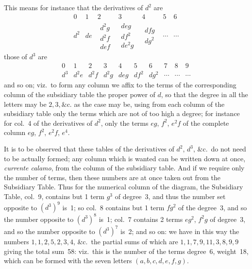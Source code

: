 \documentclass[11pt]{article}
\begin{document}
\noindent This means for instance that the derivatives of $d^2$ are
\[
\begin{array}{c|cccccc}
   0 & 1 & 2 & 3 & 4 & 5 & 6\\
\hline
   d^2 & d e & \begin{array}{c} d^2 g\\ d^2 f\\ d e f \end{array} & \begin{array}{c} d e g\\ d f^2\\ d e^2 g \end{array} & \begin{array}{c} d f g\\ d g^2 \end{array} & \cdots & \cdots
\end{array}
\]
those of $d^3$ are
\[
\begin{array}{c|cccccccccc}
   0 & 1 & 2 & 3 & 4 & 5 & 6 & 7 & 8 & 9 \\
\hline
   d^3 & d^2 e & d^2 f & d^2 g & d e g & d f^2 & d g^2 & \cdots & \cdots & \cdots
\end{array}
\]
and so on; viz.\ to form any column we affix to the terms of the corresponding column of the subsidiary table the proper power of $d$, so that the degree in all the letters may be $2, 3, \&\text{c.}$ as the case may be, using from each column of the subsidiary table only the terms which are not of too high a degree; for instance for col.~4 of the derivatives of $d^2$, only the terms $eg$, $f^2$, $e^2 f$ of the complete column $eg$, $f^2$, $e^2 f$, $e^4$.

\medskip

\noindent It is to be observed that these tables of the derivatives of $d^2$, $d^3$, \&c.\ do not need to be actually formed; any column which is wanted can be written down at once, \textit{currente calamo}, from the column of the subsidiary table. And if we require only the number of terms, then these numbers are at once taken out from the Subsidiary Table. Thus for the numerical column of the diagram, the Subsidiary Table, col.~9, contains but 1 term $g^3$ of degree~3, and thus the number set opposite to $(d^3)^9$ is~1; so col.~8 contains but 1 term $f g^2$ of the degree~3, and so the number opposite to $(d^3)^8$ is~1; col.~7 contains 2 terms $e g^2$, $f^2 g$ of degree~3, and so the number opposite to $(d^3)^7$ is~2; and so on: we have in this way the numbers $1, 1, 2, 5, 2, 3, 4$, \&c.\ the partial sums of which are $1, 1, 7, 9, 11, 3, 8, 9, 9$ giving the total sum~58: viz.\ this is the number of the terms degree~6, weight~18, which can be formed with the seven letters $(a, b, c, d, e, f, g)$.
\end{document}
